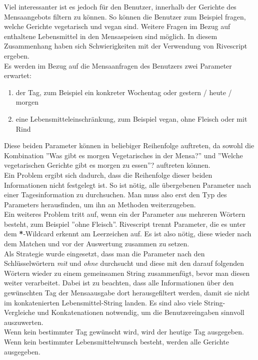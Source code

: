 Viel interessanter ist es jedoch für den Benutzer, innerhalb der Gerichte des Mensaangebots filtern zu können. So können die Benutzer zum Beispiel fragen, welche Gerichte vegetarisch und vegan sind. Weitere Fragen im Bezug auf enthaltene Lebensmittel in den Mensaspeisen sind möglich.
In diesem Zusammenhang haben sich Schwierigkeiten mit der Verwendung von Rivescript ergeben. \\
Es werden im Bezug auf die Mensaanfragen des Benutzers zwei Parameter erwartet:
\begin{enumerate}[noitemsep]
    \item der Tag, zum Beispiel ein konkreter Wochentag oder gestern / heute / morgen
    \item eine Lebensmitteleinschränkung, zum Beispiel vegan, ohne Fleisch oder mit Rind 
\end{enumerate}
Diese beiden Parameter können in beliebiger Reihenfolge auftreten, da sowohl die Kombination 
''Was gibt es morgen Vegetarisches in der Mensa?'' und
''Welche vegetarischen Gerichte gibt es morgen zu essen''?
auftreten können. \\
Ein Problem ergibt sich dadurch, dass die Reihenfolge dieser beiden Informationen nicht festgelegt ist. So ist nötig, alle übergebenen Parameter nach einer Tagesinformation zu durchsuchen. Man muss also erst den Typ des Parameters herausfinden, um ihn an Methoden weiterzugeben. \\
Ein weiteres Problem tritt auf, wenn ein der Parameter aus mehreren Wörtern besteht, zum Beispiel ''ohne Fleisch''. Rivescript trennt Parameter, die es unter dem \textbf{*}-Wildcard erkennt am Leerzeichen auf. Es ist also nötig, diese wieder nach dem Matchen und vor der Auswertung zusammen zu setzen. \\
Als Strategie wurde eingesetzt, dass man die Parameter nach den Schlüsselwörtern \emph{mit} und \emph{ohne} durchsucht und diese mit den darauf folgenden Wörtern wieder zu einem gemeinsamen String zusammenfügt, bevor man diesen weiter verarbeitet. Dabei ist zu beachten, dass alle Informationen über den gewünschten Tag der Mensaausgabe dort herausgefiltert werden, damit sie nicht im konkatenierten Lebensmittel-String landen. Es sind also viele String-Vergleiche und Konkatenationen notwendig, um die Benutzereingaben sinnvoll auszuwerten. \\
Wenn kein bestimmter Tag gewünscht wird, wird der heutige Tag ausgegeben. Wenn kein bestimmter Lebensmittelwunsch besteht, werden alle Gerichte ausgegeben.

